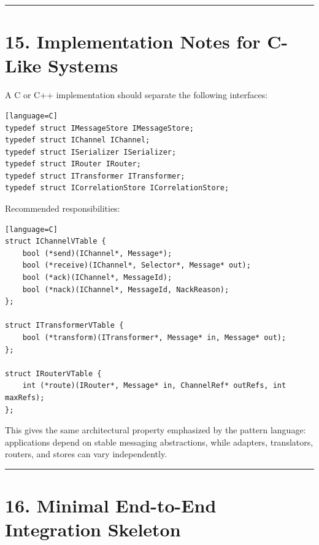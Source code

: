 \documentclass[11pt]{article}
\begin{document}
\begin{center}\rule{0.5\linewidth}{0.5pt}\end{center}

\section{15. Implementation Notes for C-Like
Systems}\label{implementation-notes-for-c-like-systems}

A C or C++ implementation should separate the following interfaces:

\begin{verbatim}[language=C]
typedef struct IMessageStore IMessageStore;
typedef struct IChannel IChannel;
typedef struct ISerializer ISerializer;
typedef struct IRouter IRouter;
typedef struct ITransformer ITransformer;
typedef struct ICorrelationStore ICorrelationStore;
\end{verbatim}

Recommended responsibilities:

\begin{verbatim}[language=C]
struct IChannelVTable {
    bool (*send)(IChannel*, Message*);
    bool (*receive)(IChannel*, Selector*, Message* out);
    bool (*ack)(IChannel*, MessageId);
    bool (*nack)(IChannel*, MessageId, NackReason);
};

struct ITransformerVTable {
    bool (*transform)(ITransformer*, Message* in, Message* out);
};

struct IRouterVTable {
    int (*route)(IRouter*, Message* in, ChannelRef* outRefs, int maxRefs);
};
\end{verbatim}

This gives the same architectural property emphasized by the pattern
language: applications depend on stable messaging abstractions, while
adapters, translators, routers, and stores can vary independently.

\begin{center}\rule{0.5\linewidth}{0.5pt}\end{center}

\section{16. Minimal End-to-End Integration
Skeleton}\label{minimal-end-to-end-integration-skeleton}
\end{document}
